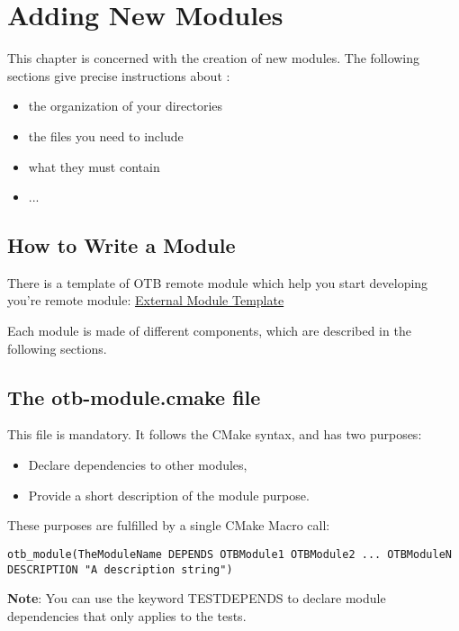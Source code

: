 \chapter{Adding New Modules}
\label{chapter:newModules}

This chapter is concerned with the creation of new modules.
The following sections give precise instructions about :
\begin{itemize}
	\item the organization of your directories
	\item the files you need to include
	\item what they must contain
	\item ...
\end{itemize}

\section{How to Write a Module}
\label{sec:writemodule}

There is a template of OTB remote module which help you  start developing you're
remote module: \href{https://gitlab.orfeo-toolbox.org/remote_modules/remote-module-template}{External Module Template}

Each module is made of different components, which are described in the following sections.

\section{The otb-module.cmake file}

This file is mandatory. It follows the CMake syntax, and has two purposes:

\begin{itemize}
       \item Declare dependencies to other modules,
       \item Provide a short description of the module purpose.
\end{itemize}

These purposes are fulfilled by a single CMake Macro call:

\begin{verbatim}
otb_module(TheModuleName DEPENDS OTBModule1 OTBModule2 ... OTBModuleN DESCRIPTION "A description string")
\end{verbatim}

\textbf{Note}: You can use the keyword TEST\textunderscore DEPENDS to declare module dependencies that only applies to the tests.

